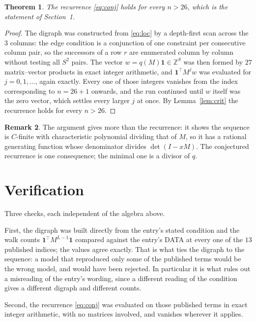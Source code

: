 \documentclass[11pt,a4paper]{article}
\theoremstyle{plain}
\newtheorem{theorem}{Theorem}
\theoremstyle{definition}
\newtheorem{remark}[theorem]{Remark}
\begin{document}
\begin{theorem}
The recurrence \eqref{eq:conj} holds for every $n>26$, which is the statement of
Section~1.
\end{theorem}

\begin{proof}
The digraph was constructed from \eqref{eq:loc} by a depth-first scan across the $3$
columns: the edge condition is a conjunction of one constraint per consecutive column
pair, so the successors of a row $r$ are enumerated column by column without testing all
$S^2$ pairs. The vector $w=q(M)\mathbf{1}\in\mathbb{Z}^{S}$ was then formed by $27$
matrix--vector products in exact integer arithmetic, and $\mathbf{1}^{\!\top}M^{j}w$ was
evaluated for $j=0,1,\dots$, again exactly. Every one of those integers vanishes from the
index corresponding to $n=26+1$ onwards, and the run continued until $w$ itself was the
zero vector, which settles every larger $j$ at once. By Lemma~\ref{lem:crit} the recurrence
holds for every $n>26$.
\end{proof}

\begin{remark}
The argument gives more than the recurrence: it shows the sequence is $C$-finite with
characteristic polynomial dividing that of $M$, so it has a rational generating function
whose denominator divides $\det(I-xM)$. The conjectured recurrence is one consequence; the
minimal one is a divisor of $q$.
\end{remark}

\section{Verification}

Three checks, each independent of the algebra above.

First, the digraph was built directly from the entry's stated condition and the walk counts
$\mathbf{1}^{\!\top}M^{L-1}\mathbf{1}$ compared against the entry's DATA at
every one of the $13$ published indices; the values agree exactly. That is what ties
the digraph to the sequence: a model that reproduced only some of the published terms would
be the wrong model, and would have been rejected. In particular it is what rules out a
misreading of the entry's wording, since a different reading of the condition gives a
different digraph and different counts.

Second, the recurrence \eqref{eq:conj} was evaluated on those published terms in exact
integer arithmetic, with no matrices involved, and vanishes wherever it applies.
\end{document}
